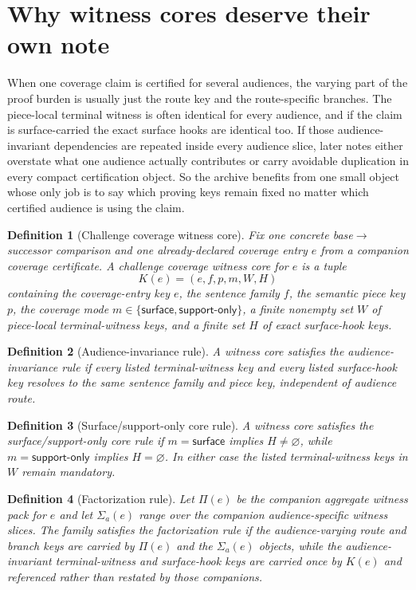 \documentclass[11pt]{article}
\newtheorem{definition}{Definition}
\begin{document}
\section{Why witness cores deserve their own note}
When one coverage claim is certified for several audiences, the varying part of the proof burden is usually just the route key and the route-specific branches.
The piece-local terminal witness is often identical for every audience, and if the claim is surface-carried the exact surface hooks are identical too.
If those audience-invariant dependencies are repeated inside every audience slice, later notes either overstate what one audience actually contributes or carry avoidable duplication in every compact certification object.
So the archive benefits from one small object whose only job is to say which proving keys remain fixed no matter which certified audience is using the claim.

\begin{definition}[Challenge coverage witness core]
Fix one concrete base$\to$successor comparison and one already-declared coverage entry $e$ from a companion coverage certificate.
A \emph{challenge coverage witness core} for $e$ is a tuple
\[
K(e)=(e,f,p,m,W,H)
\]
containing the coverage-entry key $e$, the sentence family $f$, the semantic piece key $p$, the coverage mode $m\in\{\textsf{surface},\textsf{support-only}\}$, a finite nonempty set $W$ of piece-local terminal-witness keys, and a finite set $H$ of exact surface-hook keys.
\end{definition}

\begin{definition}[Audience-invariance rule]
A witness core satisfies the \emph{audience-invariance rule} if every listed terminal-witness key and every listed surface-hook key resolves to the same sentence family and piece key, independent of audience route.
\end{definition}

\begin{definition}[Surface/support-only core rule]
A witness core satisfies the \emph{surface/support-only core rule} if $m=\textsf{surface}$ implies $H\neq\varnothing$, while $m=\textsf{support-only}$ implies $H=\varnothing$.
In either case the listed terminal-witness keys in $W$ remain mandatory.
\end{definition}

\begin{definition}[Factorization rule]
Let $\Pi(e)$ be the companion aggregate witness pack for $e$ and let $\Sigma_a(e)$ range over the companion audience-specific witness slices.
The family satisfies the \emph{factorization rule} if the audience-varying route and branch keys are carried by $\Pi(e)$ and the $\Sigma_a(e)$ objects, while the audience-invariant terminal-witness and surface-hook keys are carried once by $K(e)$ and referenced rather than restated by those companions.
\end{definition}
\end{document}
